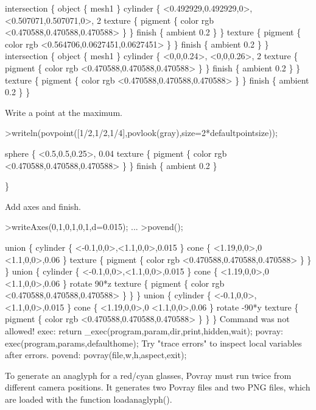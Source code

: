 \documentclass[a4paper,10pt]{article}
\begin{document}
\begin{eulernotebook}
\begin{euleroutput}
  intersection \{ object \{ mesh1 \}
  cylinder \{ <0.492929,0.492929,0>, <0.507071,0.507071,0>, 2
   texture \{ pigment \{ color rgb <0.470588,0.470588,0.470588> \}  \} 
   finish \{ ambient 0.2 \} 
   \}
   texture \{ pigment \{ color rgb <0.564706,0.0627451,0.0627451> \}  \} 
   finish \{ ambient 0.2 \} 
   \}
  intersection \{ object \{ mesh1 \}
  cylinder \{ <0,0,0.24>, <0,0,0.26>, 2
   texture \{ pigment \{ color rgb <0.470588,0.470588,0.470588> \}  \} 
   finish \{ ambient 0.2 \} 
   \}
   texture \{ pigment \{ color rgb <0.470588,0.470588,0.470588> \}  \} 
   finish \{ ambient 0.2 \} 
   \}
\end{euleroutput}
\begin{eulercomment}
Write a point at the maximum.
\end{eulercomment}
\begin{eulerprompt}
>writeln(povpoint([1/2,1/2,1/4],povlook(gray),size=2*defaultpointsize));
\end{eulerprompt}
\begin{euleroutput}
  sphere \{ <0.5,0.5,0.25>, 0.04 texture \{ pigment \{ color rgb <0.470588,0.470588,0.470588> \}  \} 
   finish \{ ambient 0.2 \} 
  
  \}
\end{euleroutput}
\begin{eulercomment}
Add axes and finish.
\end{eulercomment}
\begin{eulerprompt}
>writeAxes(0,1,0,1,0,1,d=0.015); ...
>povend();
\end{eulerprompt}
\begin{euleroutput}
  union \{
    cylinder \{ <-0.1,0,0>,<1.1,0,0>,0.015 \}
    cone \{ 
      <1.19,0,0>,0
      <1.1,0,0>,0.06
    \}
    texture \{ pigment \{ color rgb <0.470588,0.470588,0.470588> \} \}
  \}
  union \{
    cylinder \{ <-0.1,0,0>,<1.1,0,0>,0.015 \}
    cone \{ 
      <1.19,0,0>,0
      <1.1,0,0>,0.06
    \}
    rotate 90*z
    texture \{ pigment \{ color rgb <0.470588,0.470588,0.470588> \} \}
  \}
  union \{
    cylinder \{ <-0.1,0,0>,<1.1,0,0>,0.015 \}
    cone \{ 
      <1.19,0,0>,0
      <1.1,0,0>,0.06
    \}
    rotate -90*y
    texture \{ pigment \{ color rgb <0.470588,0.470588,0.470588> \} \}
  \}
  Command was not allowed!
  exec:
      return _exec(program,param,dir,print,hidden,wait);
  povray:
      exec(program,params,defaulthome);
  Try "trace errors" to inspect local variables after errors.
  povend:
      povray(file,w,h,aspect,exit); 
\end{euleroutput}
\begin{eulercomment}
To generate an anaglyph for a red/cyan glasses, Povray must run twice
from different camera positions. It generates two Povray files and two
PNG files, which are loaded with the function loadanaglyph().


\end{eulercomment}
\end{eulernotebook}
\end{document}
